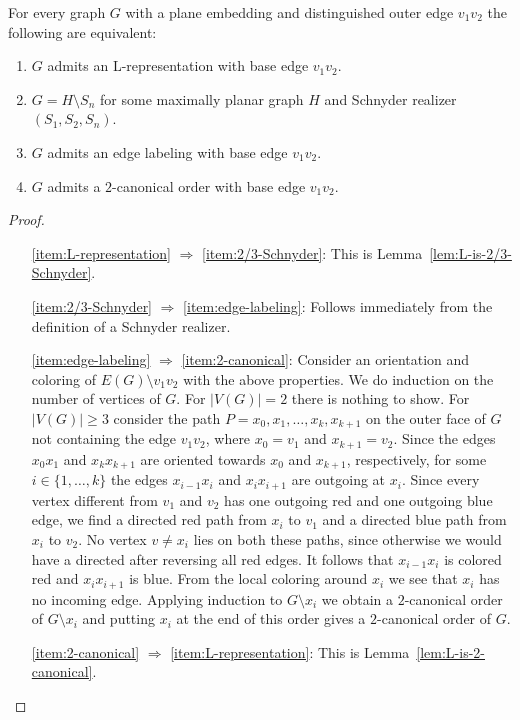 \documentclass{llncs}
\begin{document}
\begin{theorem}\label{thm:characterization}
 For every graph $G$ with a plane embedding and distinguished outer edge $v_1v_2$ the following are equivalent:
 \begin{enumerate}[label = (C\arabic*)]
  \item $G$ admits an L-representation with base edge $v_1v_2$.\label{item:L-representation}
  \item $G = H \setminus S_n$ for some maximally planar graph $H$ and Schnyder realizer $(S_1,S_2,S_n)$.\label{item:2/3-Schnyder}
\item $G$ admits an edge labeling with base edge $v_1v_2$.\label{item:edge-labeling}
  \item $G$ admits a $2$-canonical order with base edge $v_1v_2$.\label{item:2-canonical}
 \end{enumerate}
\end{theorem}
\begin{proof}
\begin{itemize}[itemindent = 45pt]
  \item[\ref{item:L-representation} $\Longrightarrow$ \ref{item:2/3-Schnyder}:] This is Lemma~\ref{lem:L-is-2/3-Schnyder}.
  
  \item[\ref{item:2/3-Schnyder} $\Longrightarrow$ \ref{item:edge-labeling}:] Follows immediately from the definition of a Schnyder realizer.
  
  \item[\ref{item:edge-labeling} $\Longrightarrow$ \ref{item:2-canonical}:] Consider an orientation and coloring of $E(G) \setminus v_1v_2$ with the above properties. We do induction on the number of vertices of $G$. For $|V(G)| = 2$ there is nothing to show. For $|V(G)| \geq 3$ consider the path $P=x_0,x_1,\ldots,x_k,x_{k+1}$ on the outer face of $G$ not containing the edge $v_1v_2$, where $x_0 = v_1$ and $x_{k+1}= v_2$. Since the edges $x_0x_1$ and $x_kx_{k+1}$ are oriented towards $x_0$ and $x_{k+1}$, respectively, for some $i \in \{1,\ldots,k\}$ the edges $x_{i-1}x_i$ and $x_ix_{i+1}$ are outgoing at $x_i$. Since every vertex different from $v_1$ and $v_2$ has one outgoing red and one outgoing blue edge, we find a directed red path from $x_i$ to $v_1$ and a directed blue path from $x_i$ to $v_2$. No vertex $v \neq x_i$ lies on both these paths, since otherwise we would have a directed after reversing all red edges. It follows that $x_{i-1}x_i$ is colored red and $x_ix_{i+1}$ is blue. From the local 
coloring around $x_i$ we see that $x_i$ has no incoming edge. Applying induction to $G \setminus x_i$ we obtain a $2$-canonical order of $G \setminus x_i$ and putting $x_i$ at the end of this order gives a $2$-canonical order of $G$.
  
  \item[\ref{item:2-canonical} $\Longrightarrow$ \ref{item:L-representation}:] This is Lemma~\ref{lem:L-is-2-canonical}.
 \end{itemize}
\end{proof}
\end{document}
